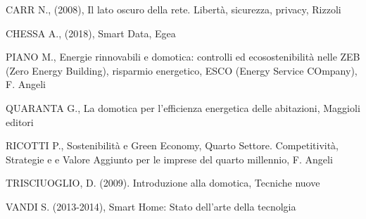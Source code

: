 \noindent CARR N., (2008), Il lato oscuro della rete. Libertà, sicurezza, privacy, Rizzoli

\noindent CHESSA A., (2018), Smart Data, Egea

\noindent PIANO M., Energie rinnovabili e domotica: controlli ed ecosostenibilità nelle ZEB (Zero Energy Building), risparmio energetico, ESCO (Energy Service COmpany), F. Angeli

\noindent QUARANTA G., La domotica per l'efficienza energetica delle abitazioni, Maggioli editori

\noindent RICOTTI P., Sostenibilità e Green Economy, Quarto Settore. Competitività, Strategie e e Valore Aggiunto per le imprese del quarto millennio, F. Angeli

\noindent TRISCIUOGLIO, D. (2009). Introduzione alla domotica, Tecniche nuove

\noindent VANDI S. (2013-2014), Smart Home: Stato dell'arte della tecnolgia



